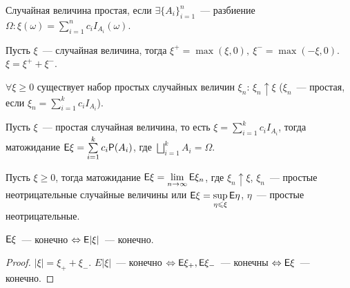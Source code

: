 \begin{definition}
    Случайная величина простая, если $\exists \{A_i\}_{i=1}^n$~--- разбиение $\Omega : \xi(\omega) = \sum\limits_{i=1}^n c_iI_{A_i}(\omega)$.
\end{definition}

\begin{definition}
    Пусть $\xi$~--- случайная величина, тогда $\xi^+ = \max(\xi, 0),\  \xi^- = \max(-\xi, 0)$. $\xi = \xi^+ + \xi^-$.
\end{definition}

\begin{lemma}[][б/д]
	$\forall \xi \geqslant 0$ существует набор простых случайных величин $\xi_n$: $\xi_n \uparrow \xi$ ($\xi_n$~--- простая, если $\xi_n = \sum\limits_{i = 1}^k c_iI_{A_i}$).
\end{lemma}

\begin{definition}
	Пусть $\xi$~--- простая случайная величина, то есть $\xi = \sum\limits_{i = 1}^k c_iI_{A_i}$, тогда матожидание $\mathsf{E} \xi = \sum\limits_{i = 1}^k c_i\mathsf{P}(A_i)$, где $\bigsqcup\limits_{i=1}^k A_i = \Omega$.
\end{definition}

\begin{definition}
	Пусть $\xi \geqslant 0$, тогда матожидание $\mathsf{E} \xi = \lim\limits_{n \rightarrow \infty} \mathsf{E} \xi_n$, где $\xi_n \uparrow \xi$, $\xi_n$~--- простые неотрицательные случайные величины или $\mathsf{E} \xi = \sup\limits_{\eta \leqslant \xi}\mathsf{E}\eta$, $\eta$~--- простые неотрицательные. 
\end{definition}
\begin{consequence}
	$\mathsf{E} \xi$~--- конечно $\Leftrightarrow \mathsf{E}|\xi|$~--- конечно.
	\begin{proof}
		$|\xi| = \xi_+ + \xi_-$. $E|\xi|$~--- конечно $\Leftrightarrow \mathsf{E}\xi_+, \mathsf{E}\xi_-$~--- конечны $\Leftrightarrow \mathsf{E}\xi$~--- конечно.
	\end{proof}
\end{consequence}

